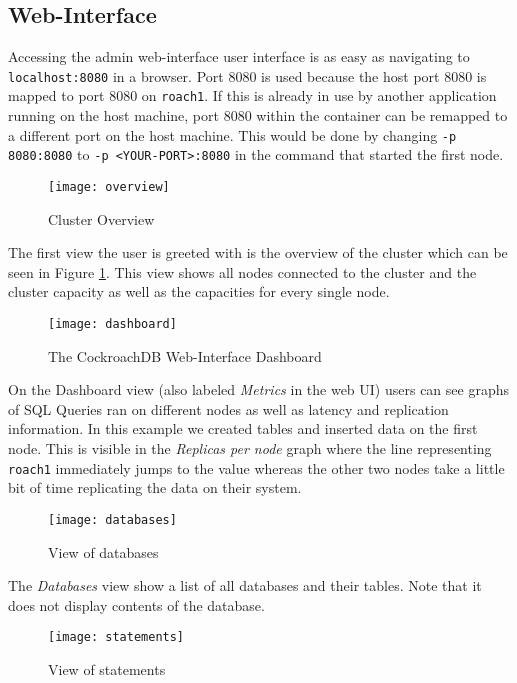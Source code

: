 \subsection{Web-Interface}\label{chap:web-interface}
Accessing the admin web-interface user interface is as easy as navigating to \verb|localhost:8080| in a browser. Port 8080 is used because the host port 8080 is mapped to port 8080 on \verb|roach1|. If this is already in use by another application running on the host machine, port 8080 within the container can be remapped to a different port on the host machine. This would be done by changing \verb|-p 8080:8080| to \verb|-p <YOUR-PORT>:8080| in the command that started the first node.

\begin{figure}[H]
    \caption{Cluster Overview}
    \texttt{[image: overview]}
    \label{fig:overview}
\end{figure}

The first view the user is greeted with is the overview of the cluster which can be seen in Figure \ref{fig:overview}. This view shows all nodes connected to the cluster and the cluster capacity as well as the capacities for every single node.

\begin{figure}[H]
    \centering
    \caption{The CockroachDB Web-Interface Dashboard}
    \texttt{[image: dashboard]}
    \label{fig:dashboard}
\end{figure}

On the Dashboard view (also labeled \emph{Metrics} in the web UI) users can see graphs of SQL Queries ran on different nodes as well as latency and replication information.
In this example we created tables and inserted data on the first node. This is visible in the \emph{Replicas per node} graph where the line representing \verb|roach1| immediately jumps to the value whereas the other two nodes take a little bit of time replicating the data on their system. 

\begin{figure}[H]
    \caption{View of databases}
    \texttt{[image: databases]}
    \label{fig:databases}
\end{figure}
The \emph{Databases} view show a list of all databases and their tables. Note that it does not display contents of the database.

\begin{figure}[H]
    \caption{View of statements}
    \texttt{[image: statements]}
    \label{fig:statements}
\end{figure}

